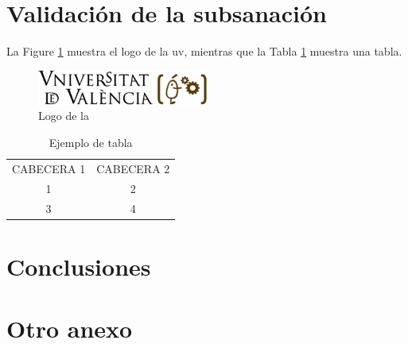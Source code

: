 \documentclass{twcam-entregable}
\begin{document}
\newpage
\section{Validación de la subsanación\label{sec:validacion}}

La Figure \ref{fig:escudo} muestra el logo de la \gls{uv}, mientras que la Tabla \ref{tbl:ejemplo} muestra una tabla.

\begin{figure}[h!t!]
    \centering
    \includegraphics[width=0.5\textwidth]{figs/ETSE}
    \caption{Logo de la }
    \label{fig:escudo}
\end{figure}

\begin{table}[h!t!]
    \centering
    \begin{tabular}{c|c}
        CABECERA 1 &  CABECERA 2\\
         1 & 2 \\
         3 & 4 \\
    \end{tabular}
    \caption{Ejemplo de tabla}
    \label{tbl:ejemplo}
\end{table}


\section{Conclusiones\label{sec:conclusiones}}

\clearpage

\printbibliography[title={Bibliografía},heading=bibnumbered]

\clearpage
\appendix %
\printglossary[type=\acronymtype,title={Acrónimos}]


\clearpage

\section{Otro anexo}
\end{document}
